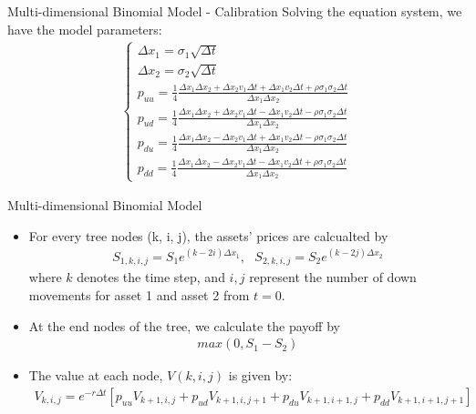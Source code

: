 \begin{frame}{Multi-dimensional Binomial Model - Calibration}
Solving the equation system, we have the model parameters:
\begin{align}
\begin{cases}
\Delta x_1 = \sigma_1 \sqrt{\Delta t} \\
\Delta x_2 = \sigma_2 \sqrt{\Delta t} \\
p_{uu} = \frac14 \frac{\Delta x_1 \Delta x_2 + \Delta x_2 v_1 \Delta t + \Delta x_1 v_2 \Delta t + \rho \sigma_1 \sigma_2 \Delta t}{\Delta x_1 \Delta x_2} \\
p_{ud} = \frac14 \frac{\Delta x_1 \Delta x_2 + \Delta x_2 v_1 \Delta t - \Delta x_1 v_2 \Delta t - \rho \sigma_1 \sigma_2 \Delta t}{\Delta x_1 \Delta x_2} \\
p_{du} = \frac14 \frac{\Delta x_1 \Delta x_2 - \Delta x_2 v_1 \Delta t + \Delta x_1 v_2 \Delta t - \rho \sigma_1 \sigma_2 \Delta t}{\Delta x_1 \Delta x_2} \\
p_{dd} = \frac14 \frac{\Delta x_1 \Delta x_2 - \Delta x_2 v_1 \Delta t - \Delta x_1 v_2 \Delta t + \rho \sigma_1 \sigma_2 \Delta t}{\Delta x_1 \Delta x_2}
\end{cases}
\end{align}
\end{frame}

\begin{frame}{Multi-dimensional Binomial Model}
\begin{itemize}
\item For every tree nodes (k, i, j), the assets' prices are calcualted by
\begin{align}
S_{1,k, i, j} = S_1 e^{(k - 2i) \Delta x_1}, ~~~S_{2, k, i, j} = S_2 e^{(k - 2j)\Delta x_2}
\end{align}
where $k$ denotes the time step, and $i, j$ represent the number of down movements for asset 1 and asset 2 from $t=0$.
\item At the end nodes of the tree, we calculate the payoff by
\begin{align}
max(0, S_1 - S_2)
\end{align}
\item The value at each node, $V(k, i, j)$ is given by:
\scriptsize
\begin{align}
V_{k, i, j} = e^{-r\Delta t} [p_{uu}V_{k+1, i, j} + p_{ud} V_{k+1, i, j+1} + p_{du} V_{k+1, i+1, j} + p_{dd} V_{k+1, i+1, j+1}]
\end{align}
\end{itemize}
\end{frame}

